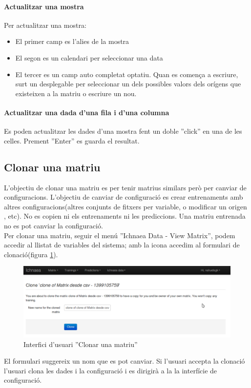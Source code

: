 \paragraph*{Actualitzar una mostra} Per actualitzar una mostra:
\begin{itemize}
\item El primer camp es l'alies de la mostra
\item El segon es un calendari per seleccionar una data
\item El tercer es un camp auto completat optatiu. Quan es comença a escriure, surt un desplegable per seleccionar un dels possibles valors dels orígens que existeixen a la matriu o escriure un nou.
\end{itemize}

\paragraph*{Actualitzar una dada d'una fila i d'una columna} Es poden actualitzar les dades d'una mostra fent un doble ''click'' en una de les celles. Prement ''Enter'' es guarda el resultat.


\subsection{Clonar una matriu}
\label{subsec:clone_matrix}
L'objectiu de clonar una matriu es per tenir matrius similars però per canviar de configuracions. L'objectiu de canviar de configuració es crear entrenaments amb altres configuracions(altres conjunts de fitxers per variable, o modificar un origen , etc). No es copien ni els entrenaments ni les prediccions. Una matriu entrenada no es pot canviar la configuració.\\

Per clonar una matriu, seguir el menú ''Ichnaea Data - View Matrix'', podem accedir al llistat de variables del sistema; amb la icona \iconclone accedim al formulari de clonaci\'{o}(figura \ref{fig:cloneMatrix}). 
\begin{figure}[h!]
  \centering
  \includegraphics[scale=0.2]{img/userguide/clone_matrix}
  \caption{Interfici d'usuari ''Clonar una matriu''}
  \label{fig:cloneMatrix}
\end{figure}
El formulari suggereix un nom que es pot canviar. Si l'usuari accepta la clonaci\'{o} l'usuari clona les dades i la configuraci\'{o} i es dirigir\`{a} a la la interfície de configuració.


